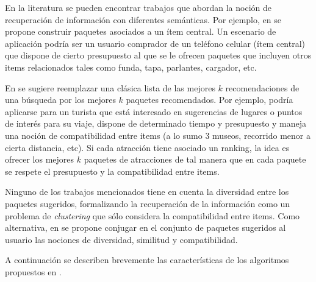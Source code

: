 En la literatura se pueden encontrar trabajos que abordan la noción de recuperación de información con diferentes semánticas. Por ejemplo, en \cite{BasuRoy:2010:CEC:1807167.1807258} se propone construir paquetes asociados a un ítem central. Un escenario de aplicación podría ser un usuario comprador de un teléfono celular (ítem central) que dispone de cierto presupuesto al que se le ofrecen paquetes que incluyen otros items relacionados tales como funda, tapa, parlantes, cargador, etc.

En \cite{Xie:2010:BOB:1864708.1864739} se sugiere reemplazar una clásica lista de las mejores $k$ recomendaciones de una búsqueda por los mejores $k$ paquetes recomendados. Por ejemplo, podría aplicarse para un turista que está interesado en sugerencias de lugares o puntos de interés para su viaje, dispone de determinado tiempo y presupuesto y maneja una noción de compatibilidad entre items (a lo sumo 3 museos, recorrido menor a cierta distancia, etc). Si cada atracción tiene asociado un ranking, la idea es ofrecer los mejores $k$ paquetes de atracciones de tal manera que en cada paquete se respete el presupuesto y la compatibilidad entre items.

Ninguno de los trabajos mencionados tiene en cuenta la diversidad entre los paquetes sugeridos, formalizando la recuperación de la información como un problema de {\em clustering} que sólo considera la compatibilidad entre items. Como alternativa, en \cite{compositeRetrival} se propone conjugar en el conjunto de paquetes sugeridos al usuario las nociones de diversidad, similitud y compatibilidad.

A continuación se describen brevemente las características de los algoritmos propuestos en \cite{compositeRetrival}.

